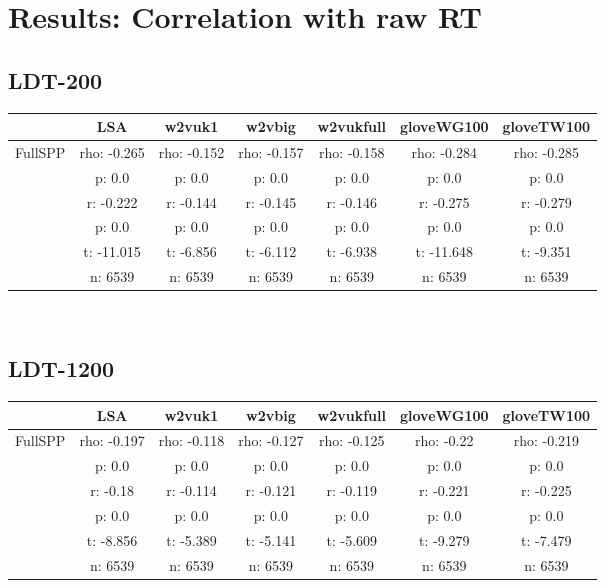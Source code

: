 \documentclass{article}
\begin{document}
\section{Results: Correlation with raw RT}\label{raw}
\subsection{LDT-200 }
\begin{tabular}{ccccccc|}\cline{2-7}
&\multicolumn{1}{|c}{LSA} & w2vuk1 & w2vbig & w2vukfull & gloveWG100 & gloveTW100 \\\hline
\multicolumn{1}{|c|}{\multirow{6}{*}{FullSPP}} & rho: -0.265 & rho: -0.152 & rho: -0.157 & rho: -0.158 & rho: -0.284 & rho: -0.285 \\
\multicolumn{1}{|c|}{} & p: 0.0 & p: 0.0 & p: 0.0 & p: 0.0 & p: 0.0 & p: 0.0 \\
\multicolumn{1}{|c|}{} & r: -0.222 & r: -0.144 & r: -0.145 & r: -0.146 & r: -0.275 & r: -0.279 \\
\multicolumn{1}{|c|}{} & p: 0.0 & p: 0.0 & p: 0.0 & p: 0.0 & p: 0.0 & p: 0.0 \\
\multicolumn{1}{|c|}{} & t: -11.015 & t: -6.856 & t: -6.112 & t: -6.938 & t: -11.648 & t: -9.351 \\
\multicolumn{1}{|c|}{} & n: 6539 & n: 6539 & n: 6539 & n: 6539 & n: 6539 & n: 6539 \\
\hline
\end{tabular}\\
\subsection{LDT-1200}
\begin{tabular}{ccccccc|}\cline{2-7}
&\multicolumn{1}{|c}{LSA} & w2vuk1 & w2vbig & w2vukfull & gloveWG100 & gloveTW100 \\\hline
\multicolumn{1}{|c|}{\multirow{6}{*}{FullSPP}} & rho: -0.197 & rho: -0.118 & rho: -0.127 & rho: -0.125 & rho: -0.22 & rho: -0.219 \\
\multicolumn{1}{|c|}{} & p: 0.0 & p: 0.0 & p: 0.0 & p: 0.0 & p: 0.0 & p: 0.0 \\
\multicolumn{1}{|c|}{} & r: -0.18 & r: -0.114 & r: -0.121 & r: -0.119 & r: -0.221 & r: -0.225 \\
\multicolumn{1}{|c|}{} & p: 0.0 & p: 0.0 & p: 0.0 & p: 0.0 & p: 0.0 & p: 0.0 \\
\multicolumn{1}{|c|}{} & t: -8.856 & t: -5.389 & t: -5.141 & t: -5.609 & t: -9.279 & t: -7.479 \\
\multicolumn{1}{|c|}{} & n: 6539 & n: 6539 & n: 6539 & n: 6539 & n: 6539 & n: 6539 \\
\hline
\end{tabular}\\
\end{document}
